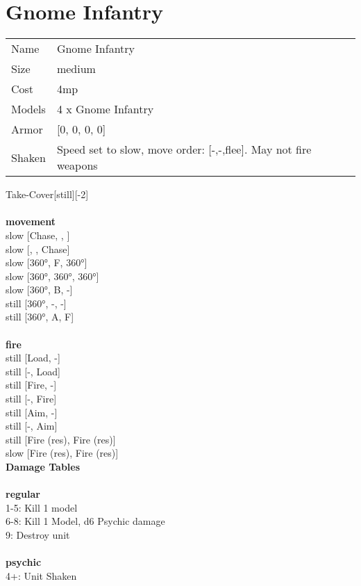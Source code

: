 \clearpage

\section{ Gnome Infantry }

\begin{tabular}{ll}
  Name & Gnome Infantry \\
  Size & medium\\
  Cost & 4mp\\
  Models & 4 x Gnome Infantry\\
  Armor & [0, 0, 0, 0]\\
  Shaken & Speed set to slow, move order: [-,-,flee]. May not fire weapons\\
\end{tabular}

\noindent Take-Cover[still][-2]\\ 


\ \\ {\bf movement } \\
slow [Chase, , ] \\
slow [, , Chase] \\
slow [360°, F, 360°] \\
slow [360°, 360°, 360°] \\
slow [360°, B, -] \\
still [360°, -, -] \\
still [360°, A, F] \\
\ \\ {\bf fire } \\
still [Load, -] \\
still [-, Load] \\
still [Fire, -] \\
still [-, Fire] \\
still [Aim, -] \\
still [-, Aim] \\
still [Fire (res), Fire (res)] \\
slow [Fire (res), Fire (res)] \\


{\bf Damage Tables} \\
\ \\ {\bf regular } \\
1-5: Kill 1 model \\
6-8: Kill 1 Model, d6 Psychic damage \\
9: Destroy unit \\
\ \\ {\bf psychic } \\
4+: Unit Shaken \\


